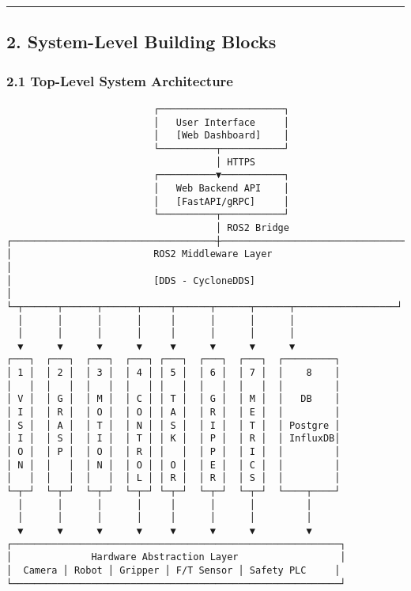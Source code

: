 \documentclass[
]{article}
\begin{document}
\begin{center}\rule{0.5\linewidth}{0.5pt}\end{center}

\hypertarget{system-level-building-blocks}{%
\subsection{2. System-Level Building
Blocks}\label{system-level-building-blocks}}

\hypertarget{top-level-system-architecture}{%
\subsubsection{2.1 Top-Level System
Architecture}\label{top-level-system-architecture}}

\begin{verbatim}
                          ┌──────────────────────┐
                          │   User Interface     │
                          │   [Web Dashboard]    │
                          └──────────┬───────────┘
                                     │ HTTPS
                          ┌──────────▼───────────┐
                          │   Web Backend API    │
                          │   [FastAPI/gRPC]     │
                          └──────────┬───────────┘
                                     │ ROS2 Bridge
┌────────────────────────────────────┼────────────────────────────────┐
│                         ROS2 Middleware Layer                       │
│                         [DDS - CycloneDDS]                          │
└─┬──────┬──────┬──────┬─────┬──────┬──────┬──────┬──────────────────┘
  │      │      │      │     │      │      │      │
  │      │      │      │     │      │      │      │
  ▼      ▼      ▼      ▼     ▼      ▼      ▼      ▼
┌───┐  ┌───┐  ┌───┐  ┌───┐ ┌───┐  ┌───┐  ┌───┐  ┌─────────┐
│ 1 │  │ 2 │  │ 3 │  │ 4 │ │ 5 │  │ 6 │  │ 7 │  │    8    │
│   │  │   │  │   │  │   │ │   │  │   │  │   │  │         │
│ V │  │ G │  │ M │  │ C │ │ T │  │ G │  │ M │  │   DB    │
│ I │  │ R │  │ O │  │ O │ │ A │  │ R │  │ E │  │         │
│ S │  │ A │  │ T │  │ N │ │ S │  │ I │  │ T │  │ Postgre │
│ I │  │ S │  │ I │  │ T │ │ K │  │ P │  │ R │  │ InfluxDB│
│ O │  │ P │  │ O │  │ R │ │   │  │ P │  │ I │  │         │
│ N │  │   │  │ N │  │ O │ │ O │  │ E │  │ C │  │         │
│   │  │   │  │   │  │ L │ │ R │  │ R │  │ S │  │         │
└─┬─┘  └─┬─┘  └─┬─┘  └─┬─┘ └─┬─┘  └─┬─┘  └─┬─┘  └────┬────┘
  │      │      │      │     │      │      │         │
  │      │      │      │     │      │      │         │
  ▼      ▼      ▼      ▼     ▼      ▼      ▼         ▼
┌──────────────────────────────────────────────────────────┐
│              Hardware Abstraction Layer                  │
│  Camera │ Robot │ Gripper │ F/T Sensor │ Safety PLC     │
└──────────────────────────────────────────────────────────┘
\end{verbatim}
\end{document}
